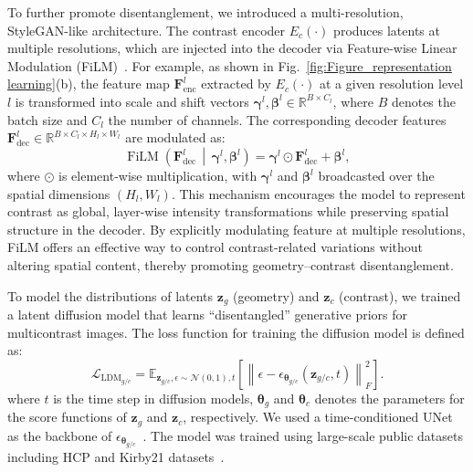 \documentclass[journal,twoside,web]{ieeecolor}
\def\z{{\mathbf z}}
\begin{document}
To further promote disentanglement, we introduced a multi-resolution, StyleGAN-like architecture. 
The contrast encoder $E_c(\cdot)$ produces latents at multiple resolutions, which are injected into 
the decoder via Feature-wise Linear Modulation (FiLM)~\cite{perez2018film}. For example, as shown in Fig.~\ref{fig:Figure_representation learning}(b), the feature map $\mathbf{F}_{\mathrm{enc}}^{l}$ extracted by $E_c(\cdot)$ at a given resolution level $l$ is transformed into 
scale and shift vectors $\boldsymbol{\gamma}^{l}, \boldsymbol{\beta}^{l} \in \mathbb{R}^{B \times C_{l}}$, 
where $B$ denotes the batch size and $C_{l}$ the number of channels. The corresponding decoder 
features $\mathbf{F}_{\mathrm{dec}}^{l} \in \mathbb{R}^{B \times C_{l} \times H_{l} \times W_{l}}$ 
are modulated as:
\begin{equation}
\operatorname{FiLM}\!\left(\mathbf{F}_{\mathrm{dec}}^{l} \,\middle|\, 
\boldsymbol{\gamma}^{l}, \boldsymbol{\beta}^{l}\right)
= \boldsymbol{\gamma}^{l} \odot \mathbf{F}_{\mathrm{dec}}^{l} + \boldsymbol{\beta}^{l},
\end{equation}
where $\odot$ is element-wise multiplication, with 
$\boldsymbol{\gamma}^{l}$ and $\boldsymbol{\beta}^{l}$ broadcasted over the spatial dimensions $(H_{l}, W_{l})$. This mechanism encourages the model to represent contrast as global, layer-wise intensity transformations while preserving spatial structure in the decoder. By explicitly modulating feature at multiple resolutions, FiLM offers an effective way to control contrast-related variations without altering spatial content, thereby promoting geometry–contrast disentanglement.

To model the distributions of latents $\z_g$ (geometry) and $\z_c$ (contrast), we trained a latent diffusion model that learns “disentangled” generative priors for multicontrast images. The loss function for training the diffusion model is defined as:
\begin{equation}
    \mathcal{L}_{\text{LDM}_{g/c}} = \mathbb{E}_{\mathbf{z}_{g/c}, \epsilon \sim \mathcal{N}(0,1), t} \left[ 
        \left\| \epsilon - \epsilon_{\boldsymbol{\theta}_{g/c}} \left( \mathbf{z}_{g/c}, t \right) \right\|_F^2 
    \right]. \label{loss_ldm}
\end{equation}
where $t$ is the time step in diffusion models, $\boldsymbol{\theta}_g$ and $\boldsymbol{\theta}_c$ denotes the parameters for the score functions of $\z_g$  and $\z_c$, respectively. We used a time-conditioned UNet as the backbone of $\epsilon_{\boldsymbol{\theta}_{g/c}}$~\cite{rombach2022high}. The model was trained using large-scale public datasets including HCP and Kirby21 datasets~\cite{van2013wu,landman2011multi}.
\end{document}
